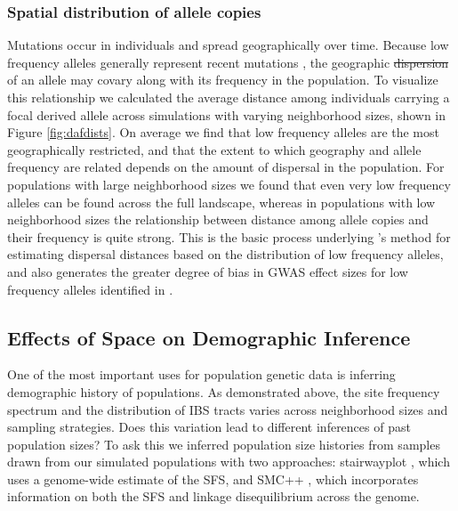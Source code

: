 \documentclass[10pt,twoside,lineno,hidelinks]{preprint} %
\providecommand{\DIFadd}[1]{{\protect\color{blue}\uwave{#1}}} %
\providecommand{\DIFdel}[1]{{\protect\color{red}\sout{#1}}}                      %
\providecommand{\DIFaddbegin}{} %
\providecommand{\DIFaddend}{} %
\providecommand{\DIFdelbegin}{} %
\providecommand{\DIFdelend}{} %
\begin{document}
\subsubsection{Spatial distribution of allele copies}

Mutations occur in individuals and spread geographically over time. Because low frequency alleles generally represent recent mutations \citep{sawyer1977past, griffiths1999ages}, the geographic \DIFdelbegin \DIFdel{dispersion }\DIFdelend \DIFaddbegin \DIFadd{spread }\DIFaddend of an allele may covary along with its frequency in the population. To visualize this relationship we calculated the average distance among individuals carrying a focal derived allele across simulations with varying neighborhood sizes, shown in Figure \ref{fig:dafdists}. On average we find that low frequency alleles are the most geographically restricted, and that the extent to which geography and allele frequency are related depends on the amount of dispersal in the population. For populations with large neighborhood sizes we found that even very low frequency alleles can be found across the full landscape, whereas in populations with low neighborhood sizes the relationship between distance among allele copies and their frequency is quite strong. This is the basic process underlying \citeauthor{Novembre2009}'s \citeyearpar{Novembre2009} method for estimating dispersal distances based on the distribution of low frequency alleles, and also generates the greater degree of bias in GWAS effect sizes for low frequency alleles identified in \citet{Mathieson2012}.


\subsection{Effects of Space on Demographic Inference}

One of the most important uses for population genetic data is inferring demographic history of populations. As demonstrated above, the site frequency spectrum and the distribution of IBS tracts varies across neighborhood sizes and sampling strategies. Does this variation lead to different inferences of past population sizes? To ask this we inferred population size histories from samples drawn from our simulated populations with two approaches: stairwayplot \citep{Liu2015}, which uses a genome-wide estimate of the SFS, and SMC++ \citep{Terhorst2016}, which incorporates information on both the SFS and linkage disequilibrium across the genome.
\end{document}

